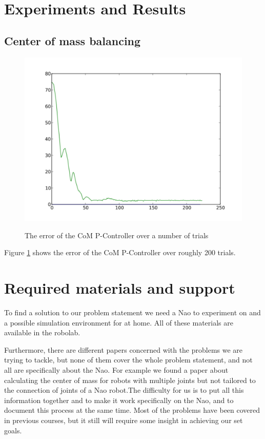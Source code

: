 \documentclass[a4paper]{article}
\begin{document}
\begin{align*}
\end{align*}

\section{Experiments and Results}
\subsection{Center of mass balancing}
\begin{figure}[htb]
	\centering
	\includegraphics[width=1\textwidth]{pics/com_error__threshold_3__gain_0_0005.pdf}
	\label{fig:com_plot}
	\caption{The error of the CoM P-Controller over a number of trials}
\end{figure}

Figure \ref{fig:com_plot} shows the error of the CoM P-Controller over roughly 200
trials.

\section{Required materials and support} 
To find a solution to our problem statement we need a Nao to experiment on and a
possible simulation environment for at home. All of these materials are
available in the robolab.

Furthermore, there are different papers concerned with the problems we are
trying to tackle, but none of them cover the whole problem statement, and not
all are specifically about the Nao. For example we found a paper about
calculating the center of mass for robots with multiple joints\cite{Cotton2008} but not tailored
to the connection of joints of a  Nao robot.The difficulty for us is to put all this
information together and to make it work specifically on the Nao, and to
document this process at the same time. Most of the problems have been covered
in previous courses, but it still will require some insight in achieving our set
goals.




\end{document}
